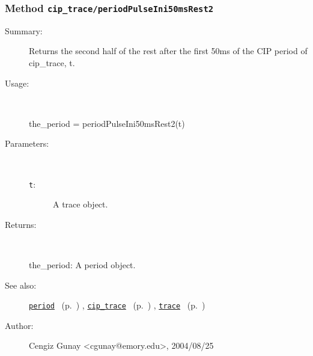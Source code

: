 \subsubsection[Method \texttt{periodPulseIni50msRest2}]{Method \texttt{cip\_trace/periodPulseIni50msRest2}}%
%
\label{ref_cip_trace__periodPulseIni50msRest2}%
\hypertarget{ref_cip_trace__periodPulseIni50msRest2}{}%
\begin{description}
\item[Summary:]Returns the second half of the rest after the 
			first 50ms of the CIP period of cip\_trace, t. 
%
\item[Usage:]~%
\begin{lyxcode}%
the\_period = periodPulseIni50msRest2(t)
%
\end{lyxcode}%
%
%
\item[Parameters:]~
\begin{description}%
\item[\texttt{t}:]
 A trace object.
\end{description}%
%
\item[Returns:]~

	the\_period: A period object.
%
%
\item[See also:]%
\hyperlink{ref_period}{\texttt{period}}%
\ (p.~\pageref{ref_period})%
%
, \hyperlink{ref_cip_trace}{\texttt{cip\_trace}}%
\ (p.~\pageref{ref_cip_trace})%
%
, \hyperlink{ref_trace}{\texttt{trace}}%
\ (p.~\pageref{ref_trace})%
%
%
\item[Author:]%
Cengiz Gunay <cgunay@emory.edu>, 2004/08/25%
\end{description}
\methodline%
